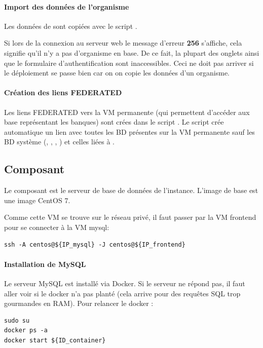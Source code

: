 \paragraph*{Import des données de l'organisme \theOrg{}}

Les données de \theOid{} sont copiées avec le script .

\begin{mycolorbox}
    Si lors de la connexion au serveur web le message d'erreur \textbf{256} s'affiche, cela signifie qu'il n'y a pas d'organisme en base.
    De ce fait, la plupart des onglets ainsi que le formulaire d'authentification sont inaccessibles.
    Ceci ne doit pas arriver si le déploiement se passe bien car on on copie les données d'un organisme.
\end{mycolorbox}

\paragraph*{Création des liens FEDERATED}

Les liens FEDERATED vers la VM permanente (qui permettent d'accéder aux base représentant les banques) sont crées
dans le script .
Le script crée automatique un lien avec toutes les BD présentes sur la VM permanente sauf les BD système (, , , )
et celles liées à .

\subsection {Composant }\label{mysql}

Le composant  est le serveur de base de données de l'instance.
L'image de base est une image CentOS 7.

Comme cette VM se trouve sur le réseau privé, il faut passer par la VM frontend pour se connecter à la VM mysql:
\begin{lstlisting}[style=bash]
ssh -A centos@${IP_mysql} -J centos@${IP_frontend}
\end{lstlisting}

\paragraph*{Installation de MySQL}

Le serveur MySQL est installé via Docker.
Si le serveur ne répond pas, il faut aller voir si le docker n'a pas planté (cela arrive pour des requêtes SQL trop gourmandes en RAM).
Pour relancer le docker :
\begin{lstlisting}[style=bash]
sudo su
docker ps -a
docker start ${ID_container}
\end{lstlisting}

